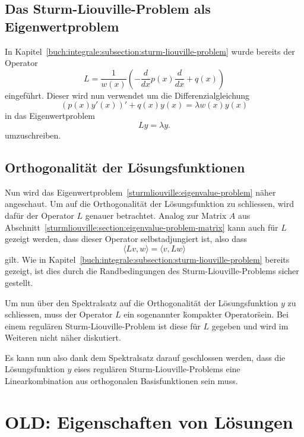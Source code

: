 \subsection{Das Sturm-Liouville-Problem als Eigenwertproblem}

In Kapitel~\ref{buch:integrale:subsection:sturm-liouville-problem} wurde bereits
der Operator
\[
    L
    =
    \frac{1}{w(x)}\left( -\frac{d}{dx}p(x) \frac{d}{dx} + q(x)\right)
\]
eingeführt.
Dieser wird nun verwendet um die Differenzialgleichung 
\[
    (p(x)y'(x))' + q(x)y(x)
    =
    \lambda w(x) y(x)
\]
in das Eigenwertproblem
\begin{equation}
    \label{sturmliouville:eigenvalue-problem}
    L y
    =
    \lambda y.
\end{equation}
umzuschreiben.

\subsection{Orthogonalität der Lösungsfunktionen}

Nun wird das Eigenwertproblem~\eqref{sturmliouville:eigenvalue-problem} näher
angeschaut.
Um auf die Orthogonalität der Lösungsfunktion zu schliessen, wird dafür der
Operator $L$ genauer betrachtet.
Analog zur Matrix $A$ aus 
Abschnitt~\ref{sturmliouville:section:eigenvalue-problem-matrix} kann auch für
$L$ gezeigt werden, dass dieser Operator selbstadjungiert ist, also dass
\[
    \langle L v, w\rangle
    =
    \langle v, L w\rangle
\]
gilt.
Wie in Kapitel~\ref{buch:integrale:subsection:sturm-liouville-problem} bereits
gezeigt, ist dies durch die Randbedingungen des Sturm-Liouville-Problems
sicher gestellt.

Um nun über den Spektralsatz auf die Orthogonalität der Lösungsfunktion $y$ zu
schliessen, muss der Operator $L$ ein sogenannter \"kompakter Operator\" sein.
Bei einem regulären Sturm-Liouville-Problem ist diese für $L$ gegeben und wird
im Weiteren nicht näher diskutiert.

Es kann nun also dank dem Spektralsatz darauf geschlossen werden, dass die
Lösungsfunktion $y$ eises regulären Sturm-Liouville-Problems eine
Linearkombination aus orthogonalen Basisfunktionen sein muss.


\iffalse

\section{OLD: Eigenschaften von Lösungen
}

